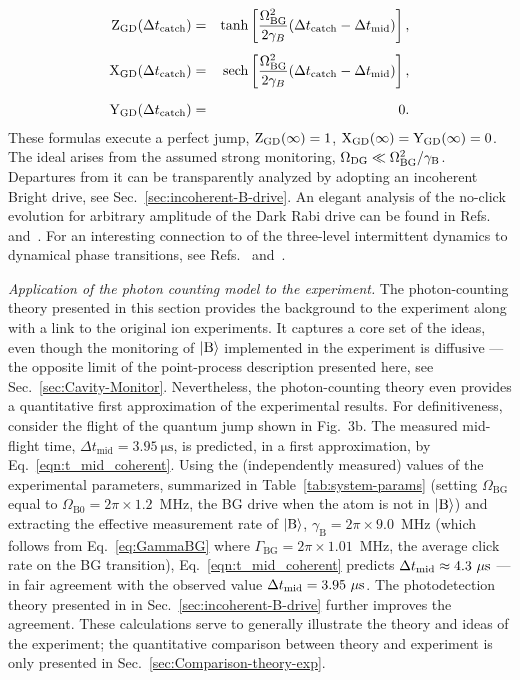 \documentclass[
						superscriptaddress, 																 amsmath, amssymb,
		 aps,  prb,  
										floatfix,
		linenumbers,
			]{revtex4-1}
\newcommand{\ket}[1]{\left|#1\right>}
\begin{document}
\begin{eqnarray}
{\rm Z}_{\rm GD}(\Delta t_{\rm catch})&=&{\rm tanh}\left[\frac{\Omega^2_{\rm BG}}{2\gamma_B}(\Delta t_{\rm catch}-\Delta t_{\rm mid})\right],
\label{eqn:Z_approx}\\
\noalign{\vskip4pt}
{\rm X}_{\rm GD}(\Delta t_{\rm catch})&=&{\rm sech}\left[\frac{\Omega^2_{\rm BG}}{2\gamma_B}(\Delta t_{\rm catch}-\Delta t_{\rm mid})\right],
\label{eqn:X_approx}\\
\noalign{\vskip6pt}
{\rm Y}_{\rm GD}(\Delta t_{\rm catch})&=&0.
\label{eqn:Y_approx}
\end{eqnarray}
These formulas execute a perfect jump, ${\rm Z}_{\rm GD}(\infty)=1$, ${\rm X}_{\rm GD}(\infty)={\rm Y}_{\rm GD}(\infty)=0$. The ideal arises from the assumed strong monitoring, $\Omega_{\rm DG}\ll\Omega^2_{\rm BG}/\gamma_{\rm B}$. Departures from it can be transparently analyzed by adopting an incoherent Bright drive, see Sec.~\ref{sec:incoherent-B-drive}. 
An elegant analysis of the no-click evolution for arbitrary amplitude of the Dark Rabi drive can be found in Refs.~ and~. For an interesting connection to of the three-level intermittent dynamics to dynamical phase transitions, see Refs.~ and~.



\textit{Application of the photon counting model to the experiment.} 
The photon-counting theory presented in this section  provides the background to the experiment along with a link to the original ion experiments.
It captures a core set of the ideas, even though the monitoring of $|\rm B\rangle$ implemented in the experiment is diffusive --- the opposite limit of the point-process description presented here, see Sec.~\ref{sec:Cavity-Monitor}. 
Nevertheless, the photon-counting theory even provides a quantitative first approximation of the experimental results. 
For definitiveness, consider the flight of the quantum jump shown in Fig.~3b.
The measured mid-flight time, $\Delta t_\mathrm{mid} = 3.95~\mathrm{\mu s}$, is predicted, in a first approximation, by Eq.~\eqref{eqn:t_mid_coherent}.
Using the (independently measured) values of the experimental parameters, summarized in Table~\ref{tab:system-params} (setting $\Omega_\mathrm{BG}$ equal to  $\Omega_\mathrm{B0} = 2\pi\times1.2$~MHz, the BG drive when the atom is not in $\ket{\rm B}$) and extracting the effective measurement rate of $|\rm B\rangle$, $\gamma_\mathrm{B} = 2\pi\times 9.0$~MHz (which follows from Eq.~\eqref{eq:GammaBG} where $\Gamma_\mathrm{BG} = 2\pi\times1.01$~MHz, the average click rate on the BG transition), Eq.~\eqref{eqn:t_mid_coherent} predicts $\Delta t_{\rm mid} \approx 4.3~\mathrm{\mu s}$ --- in fair agreement with the observed value $\Delta t_{\rm mid}  = 3.95~\mathrm{\mu s}$. 
The photodetection theory presented in in Sec.~\ref{sec:incoherent-B-drive} further improves the agreement. These calculations serve to generally illustrate the theory and ideas of the experiment; the quantitative comparison between theory and experiment is only presented in Sec.~\ref{sec:Comparison-theory-exp}.
\end{document}
